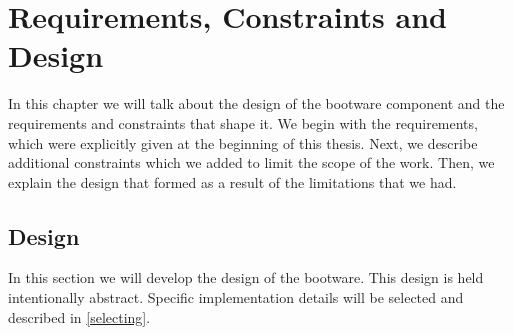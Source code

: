 \chapter{Requirements, Constraints and Design}

In this chapter we will talk about the design of the bootware component and the requirements and constraints that shape it.
We begin with the requirements, which were explicitly given at the beginning of this thesis.
Next, we describe additional constraints which we added to limit the scope of the work.
Then, we explain the design that formed as a result of the limitations that we had.




\section{Design}
\label{design}

In this section we will develop the design of the bootware.
This design is held intentionally abstract.
Specific implementation details will be selected and described in \autoref{selecting}.









